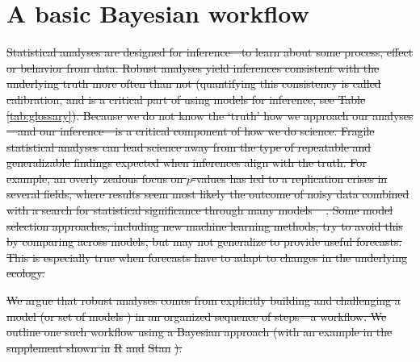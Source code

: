 \documentclass[11pt]{article}
\providecommand{\DIFdeltex}[1]{{\protect\color{red}\sout{#1}}}                      %
\providecommand{\DIFdelbegin}{} %
\providecommand{\DIFdelend}{} %
\providecommand{\DIFdel}[1]{\texorpdfstring{\DIFdeltex{#1}}{}} %
\newcommand{\DIFscaledelfig}{0.5}
\newlength{\DIFdelgraphicswidth} %
\newlength{\DIFdelgraphicsheight} %
\newcommand{\DIFdelincludegraphics}[2][]{%
\sbox{\DIFdelgraphicsbox}{\DIFOincludegraphics[#1]{#2}}%
\settoboxwidth{\DIFdelgraphicswidth}{\DIFdelgraphicsbox} %
\settoboxtotalheight{\DIFdelgraphicsheight}{\DIFdelgraphicsbox} %
\scalebox{\DIFscaledelfig}{%
\parbox[b]{\DIFdelgraphicswidth}{\usebox{\DIFdelgraphicsbox}\\[-\baselineskip] \rule{\DIFdelgraphicswidth}{0em}}\llap{\resizebox{\DIFdelgraphicswidth}{\DIFdelgraphicsheight}{%
\setlength{\unitlength}{\DIFdelgraphicswidth}%
\begin{picture}(1,1)%
\thicklines\linethickness{2pt} %
{\color[rgb]{1,0,0}\put(0,0){\framebox(1,1){}}}%
{\color[rgb]{1,0,0}\put(0,0){\line( 1,1){1}}}%
{\color[rgb]{1,0,0}\put(0,1){\line(1,-1){1}}}%
\end{picture}%
}\hspace*{3pt}}} %
} %
\DeclareRobustCommand{\DIFdelbegin}{\DIFOdelbegin \let\includegraphics\DIFdelincludegraphics} %
\DeclareRobustCommand{\DIFdelend}{\DIFOaddend \let\includegraphics\DIFOincludegraphics} %
\begin{document}
\section*{A basic Bayesian workflow}
\DIFdelbegin \DIFdel{Statistical analyses are designed for inference---to learn about some process, effect or behavior from data. Robust analyses yield inferences consistent with the underlying truth more often than not (quantifying this consistency is called calibration, and is a critical part of using models for inference, see Table \ref{tab:glossary}). Because we do not know the `truth' how we approach our analyses---and our inference---is a critical component of how we do science. Fragile statistical analyses can lead science away from the type of repeatable and generalizable findings expected when inferences align with the truth. For example, an overly zealous focus on $p$-values has led to a replication crises in several fields, where results seem most likely the outcome of noisy data combined with a search for statistical significance through many models \mbox{%
\citep[effectively a garden of forking paths,][]{halsey2015,loken2017}}\hskip0pt%
. Some model selection approaches, including new machine learning methods, try to avoid this by comparing across models, but may not generalize to provide useful forecasts.  This is especially true when forecasts have to adapt to changes in the underlying ecology.
}\DIFdelend %

\DIFdelbegin \DIFdel{We argue that robust analyses comes from explicitly building and challenging a model (or set of models ) in an organized sequence of steps---a workflow. We outline one such workflow using a Bayesian approach (with an example in the supplement shown in }\textsf{\DIFdel{R}} %
\DIFdel{and }\textsf{\DIFdel{Stan}}%
\DIFdel{). }%
\end{document}
